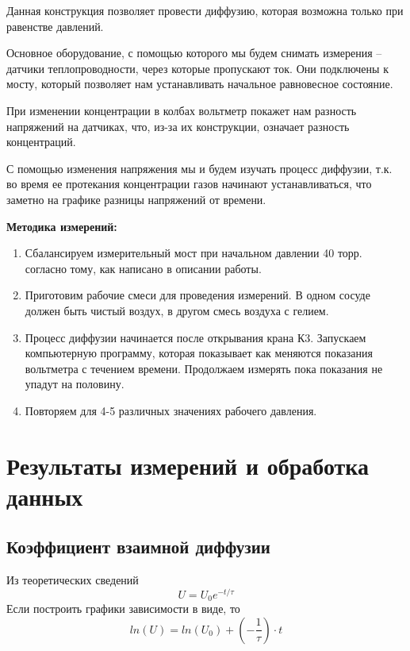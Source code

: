 \documentclass[a4paper,12pt]{article}
\begin{document}
	Данная конструкция позволяет провести диффузию, которая возможна только при равенстве давлений.
	
	Основное оборудование, с помощью которого мы будем снимать измерения -- датчики теплопроводности, через которые пропускают ток. Они подключены к мосту, который позволяет нам устанавливать начальное равновесное состояние.
	
	При изменении концентрации в колбах вольтметр покажет нам разность напряжений на датчиках, что, из-за их конструкции, означает разность концентраций. 
	
	С помощью изменения напряжения мы и будем изучать процесс диффузии, т.к. во время ее протекания концентрации газов начинают устанавливаться, что заметно на графике разницы напряжений от времени.
	
    \bigskip
    \textbf{Методика измерений:} 
    \begin{enumerate}
        \item Сбалансируем измерительный мост при начальном давлении 40 торр. согласно тому, как написано в описании работы.
        \item Приготовим рабочие смеси для проведения измерений. В одном сосуде должен быть чистый воздух, в другом смесь воздуха с гелием. 
        \item Процесс диффузии начинается после открывания крана К3. Запускаем компьютерную программу, которая показывает как меняются показания вольтметра с течением времени. Продолжаем измерять пока показания не упадут на половину.
        \item Повторяем для 4-5 различных значениях рабочего давления.
    \end{enumerate}


    \section{Результаты измерений и обработка данных}
    \subsection*{Коэффициент взаимной диффузии}
    Из теоретических сведений
    \[ U=U_0e^{-t/\tau} \] 
    Если построить графики зависимости в виде, то
    \[ ln(U) = ln(U_0) + (-\dfrac{1}{\tau}) \cdot t \]
\end{document}
